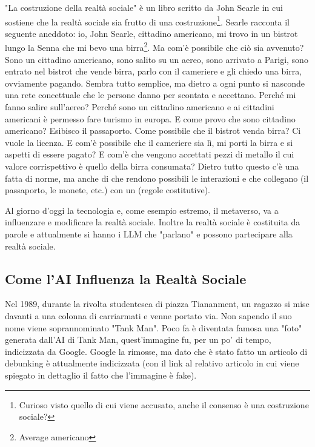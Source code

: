 "La costruzione della realtà sociale" è un libro scritto da John Searle in cui sostiene che la realtà sociale sia frutto di una costruzione\footnote{Curioso visto quello di cui viene accusato, anche il consenso è una costruzione sociale?}. Searle racconta il seguente aneddoto: io, John Searle, cittadino americano, mi trovo in un bistrot lungo la Senna che mi bevo una birra\footnote{Average americano}. Ma com'è possibile che ciò sia avvenuto? Sono un cittadino americano, sono salito su un aereo, sono arrivato a Parigi, sono entrato nel bistrot che vende birra, parlo con il cameriere e gli chiedo una birra, ovviamente pagando. Sembra tutto semplice, ma dietro a ogni punto si nasconde una rete concettuale che le persone danno per scontata e accettano. Perché mi fanno salire sull'aereo? Perché sono un cittadino americano e ai cittadini americani è permesso fare turismo in europa. E come provo che sono cittadino americano? Esibisco il passaporto. Come possibile che il bistrot venda birra? Ci vuole la licenza. E com'è possibile che il cameriere sia lì, mi porti la birra e si aspetti di essere pagato? E com'è che vengono accettati pezzi di metallo il cui valore corrispettivo è quello della birra consumata? Dietro tutto questo c'è una  fatta di norme, ma anche di  che rendono possibili le interazioni e che collegano  (il passaporto, le monete, etc.) con un  (regole costitutive).

Al giorno d'oggi la tecnologia e, come esempio estremo, il metaverso, va a influenzare e modificare la realtà sociale. Inoltre la realtà sociale è costituita da parole e attualmente si hanno i LLM che "parlano" e possono partecipare alla realtà sociale. 

\subsection{Come l'AI Influenza la Realtà Sociale}

Nel 1989, durante la rivolta studentesca di piazza Tiananment, un ragazzo si mise davanti a una colonna di carriarmati e venne portato via. Non sapendo il suo nome viene soprannominato "Tank Man". Poco fa è diventata famosa una "foto" generata dall'AI di Tank Man, quest'immagine fu, per un po' di tempo, indicizzata da Google. Google la rimosse, ma dato che è stato fatto un articolo di debunking è attualmente indicizzata (con il link al relativo articolo in cui viene spiegato in dettaglio il fatto che l'immagine è fake). 

